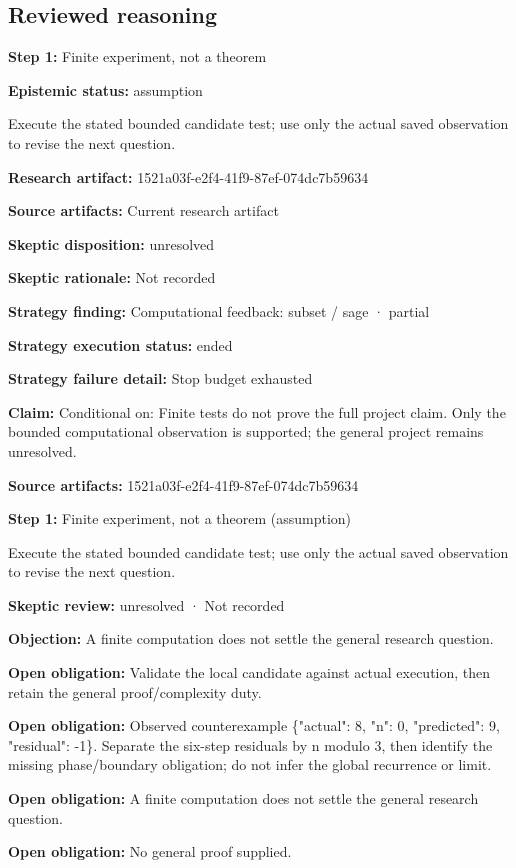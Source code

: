 \documentclass[11pt]{article}
\begin{document}
\subsection{Reviewed reasoning}
\textbf{Step 1:} Finite experiment, not a theorem\par
\textbf{Epistemic status:} assumption\par
Execute the stated bounded candidate test; use only the actual saved observation to revise the next question.\par
\textbf{Research artifact:} 1521a03f-e2f4-41f9-87ef-074dc7b59634\par
\textbf{Source artifacts:} Current research artifact\par
\textbf{Skeptic disposition:} unresolved\par
\textbf{Skeptic rationale:} Not recorded\par
\textbf{Strategy finding:} Computational feedback: subset / sage · partial\par
\textbf{Strategy execution status:} ended\par
\textbf{Strategy failure detail:} Stop budget exhausted\par
\textbf{Claim:} Conditional on: Finite tests do not prove the full project claim. Only the bounded computational observation is supported; the general project remains unresolved.\par
\textbf{Source artifacts:} 1521a03f-e2f4-41f9-87ef-074dc7b59634\par
\textbf{Step 1:} Finite experiment, not a theorem (assumption)\par
Execute the stated bounded candidate test; use only the actual saved observation to revise the next question.\par
\textbf{Skeptic review:} unresolved · Not recorded\par
\textbf{Objection:} A finite computation does not settle the general research question.\par
\textbf{Open obligation:} Validate the local candidate against actual execution, then retain the general proof/complexity duty.\par
\textbf{Open obligation:} Observed counterexample \{"actual": 8, "n": 0, "predicted": 9, "residual": -1\}. Separate the six-step residuals by n modulo 3, then identify the missing phase/boundary obligation; do not infer the global recurrence or limit.\par
\textbf{Open obligation:} A finite computation does not settle the general research question.\par
\textbf{Open obligation:} No general proof supplied.\par
\end{document}
